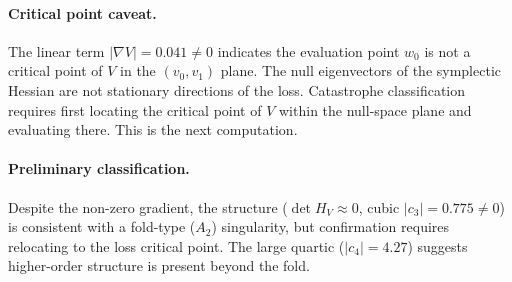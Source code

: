 \documentclass[11pt]{amsart}
\begin{document}
\paragraph{Critical point caveat.}
The linear term $|\nabla V| = 0.041 \neq 0$ indicates the evaluation
point $w_0$ is not a critical point of $V$ in the $(v_0, v_1)$ plane.
The null eigenvectors of the symplectic Hessian are not stationary
directions of the loss.
Catastrophe classification requires first locating the critical point
of $V$ within the null-space plane and evaluating there.
This is the next computation.

\paragraph{Preliminary classification.}
Despite the non-zero gradient, the structure
($\det H_V \approx 0$, cubic $|c_3| = 0.775 \neq 0$)
is consistent with a fold-type ($A_2$) singularity,
but confirmation requires relocating to the loss critical point.
The large quartic ($|c_4| = 4.27$) suggests higher-order structure
is present beyond the fold.
\end{document}
